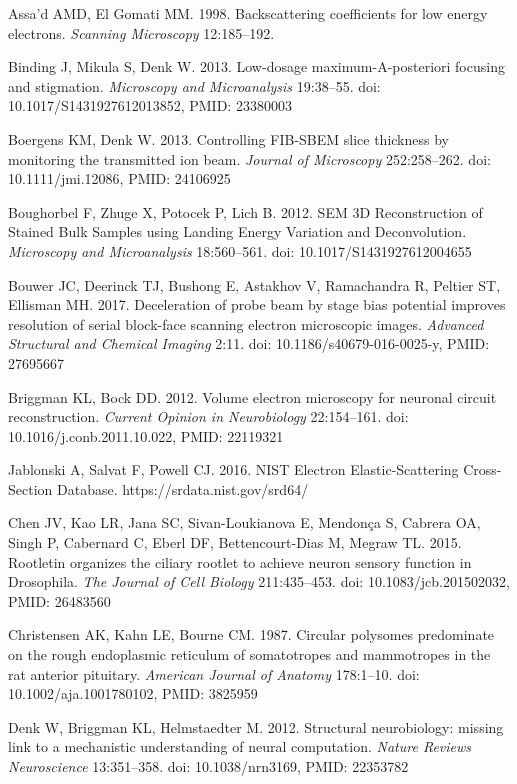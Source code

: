 \documentclass{article}
\begin{document}
\begin{hangpars}
\small
Assa’d AMD, El Gomati MM. 1998. Backscattering coefficients for low energy electrons. \emph{Scanning Microscopy} 12:185–192.

Binding J, Mikula S, Denk W. 2013. Low-dosage maximum-A-posteriori focusing and stigmation. \emph{Microscopy and Microanalysis} 19:38–55. doi: 10.1017/S1431927612013852, PMID: 23380003

Boergens KM, Denk W. 2013. Controlling FIB-SBEM slice thickness by monitoring the transmitted ion beam. \emph{Journal of Microscopy} 252:258–262. doi: 10.1111/jmi.12086, PMID: 24106925

Boughorbel F, Zhuge X, Potocek P, Lich B. 2012. SEM 3D Reconstruction of Stained Bulk Samples using Landing Energy Variation and Deconvolution. \emph{Microscopy and Microanalysis} 18:560–561. doi: 10.1017/S1431927612004655

Bouwer JC, Deerinck TJ, Bushong E, Astakhov V, Ramachandra R, Peltier ST, Ellisman MH. 2017. Deceleration of probe beam by stage bias potential improves resolution of serial block-face scanning electron microscopic images. \emph{Advanced Structural and Chemical Imaging} 2:11. doi: 10.1186/s40679-016-0025-y, PMID: 27695667

Briggman KL, Bock DD. 2012. Volume electron microscopy for neuronal circuit reconstruction. \emph{Current Opinion in Neurobiology} 22:154–161. doi: 10.1016/j.conb.2011.10.022, PMID: 22119321

Jablonski A, Salvat F, Powell CJ. 2016. NIST Electron Elastic-Scattering Cross-Section Database. https://srdata.nist.gov/srd64/

Chen JV, Kao LR, Jana SC, Sivan-Loukianova E, Mendonça S, Cabrera OA, Singh P, Cabernard C, Eberl DF, Bettencourt-Dias M, Megraw TL. 2015. Rootletin organizes the ciliary rootlet to achieve neuron sensory function in Drosophila. \emph{The Journal of Cell Biology} 211:435–453. doi: 10.1083/jcb.201502032, PMID: 26483560

Christensen AK, Kahn LE, Bourne CM. 1987. Circular polysomes predominate on the rough endoplasmic reticulum of somatotropes and mammotropes in the rat anterior pituitary. \emph{American Journal of Anatomy} 178:1–10. doi: 10.1002/aja.1001780102, PMID: 3825959

Denk W, Briggman KL, Helmstaedter M. 2012. Structural neurobiology: missing link to a mechanistic understanding of neural computation. \emph{Nature Reviews Neuroscience} 13:351–358. doi: 10.1038/nrn3169, PMID: 22353782


\end{hangpars}
\end{document}

